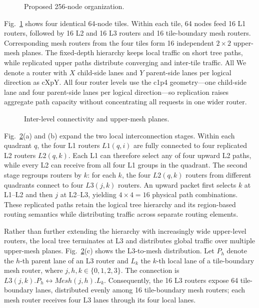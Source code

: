 \documentclass[conference]{IEEEtran}
\begin{document}
\begin{figure}[!t]
\centering

\caption{Proposed 256-node organization.}
\label{fig:topology-overview}
\end{figure}

Fig.~\ref{fig:topology-overview} shows four identical 64-node tiles.
Within each tile, 64 nodes feed 16 L1 routers, followed by 16 L2 and
16 L3 routers and 16 tile-boundary mesh routers. Corresponding
mesh routers from the four tiles form 16 independent \(2\times2\) upper-mesh planes.
The fixed-depth hierarchy keeps local traffic on short tree paths, while
replicated upper paths distribute converging and inter-tile traffic. All
We denote a router with \(X\) child-side lanes and \(Y\) parent-side lanes
per logical direction as cXpY. All four router levels use the c1p4
geometry---one child-side lane and four
parent-side lanes per logical direction---so replication raises aggregate
path capacity without concentrating all requests in one wider router.

\begin{figure}[!t]
\centering

\caption{Inter-level connectivity and upper-mesh planes.}
\label{fig:topology-connectivity}
\end{figure}

Fig.~\ref{fig:topology-connectivity}(a) and (b) expand the two local
interconnection stages. Within each quadrant \(q\), the four L1 routers
\(L1(q,i)\) are fully connected to four replicated L2 routers \(L2(q,k)\).
Each L1 can therefore select any of four upward L2 paths, while every L2
can receive from all four L1 groups in the quadrant. The second stage
regroups routers by \(k\): for each \(k\), the four \(L2(q,k)\) routers
from different quadrants connect to four \(L3(j,k)\) routers. An upward
packet first selects \(k\) at L1--L2 and then \(j\) at L2--L3, yielding
\(4\times4=16\) physical path combinations. These replicated paths retain
the logical tree hierarchy and its region-based routing semantics while
distributing traffic across separate routing elements.

Rather than further extending the hierarchy with increasingly wide
upper-level routers, the local tree terminates at L3 and distributes
global traffic over multiple upper-mesh planes. Fig.~\ref{fig:topology-connectivity}(c)
shows the L3-to-mesh distribution. Let \(P_h\) denote the \(h\)-th parent
lane of an L3 router and \(L_k\) the \(k\)-th local lane of a tile-boundary mesh router,
where \(j,h,k\in\{0,1,2,3\}\). The connection is
\(L3(j,k).P_h \leftrightarrow Mesh(j,h).L_k\). Consequently, the 16 L3
routers expose 64 tile-boundary lanes, distributed evenly among 16
tile-boundary mesh routers; each mesh router receives four L3 lanes through
its four local lanes.
\end{document}
